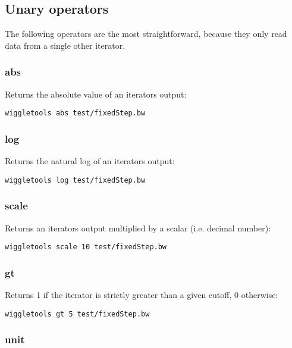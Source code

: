 \documentclass[12pt]{article}
\begin{document}
\subsection{Unary operators}

The following operators are the most straightforward, because they only read data from a single other iterator.

\subsubsection{abs}

Returns the absolute value of an iterators output:

\begin{verbatim}
wiggletools abs test/fixedStep.bw 
\end{verbatim}

\subsubsection{log}

Returns the natural log of an iterators output:

\begin{verbatim}
wiggletools log test/fixedStep.bw 
\end{verbatim}

\subsubsection{scale}

Returns an iterators output multiplied by a scalar (i.e. decimal number):

\begin{verbatim}
wiggletools scale 10 test/fixedStep.bw 
\end{verbatim}


\subsubsection{gt}

Returns 1 if the iterator is strictly greater than a given cutoff, 0 otherwise:

\begin{verbatim}
wiggletools gt 5 test/fixedStep.bw 
\end{verbatim}

\subsubsection{unit}
\end{document}
